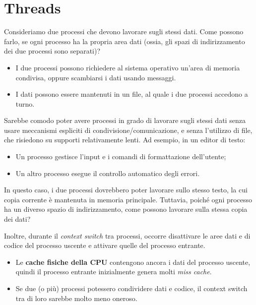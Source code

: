 \chapter{Threads}

Consideriamo due processi che devono lavorare sugli stessi dati. Come possono farlo, se ogni processo ha la propria area dati (ossia, gli spazi di indirizzamento dei due processi sono separati)?

\begin{itemize}
    \item I due processi possono richiedere al sistema operativo un’area di memoria condivisa, oppure scambiarsi i dati usando messaggi.
    \item I dati possono essere mantenuti in un file, al quale i due processi accedono a turno.
\end{itemize}

Sarebbe comodo poter avere processi in grado di lavorare sugli stessi dati senza usare meccanismi espliciti di condivisione/comunicazione, e senza l’utilizzo di file, che risiedono su supporti relativamente lenti. Ad esempio, in un editor di testo:
\begin{itemize}
    \item Un processo gestisce l’input e i comandi di formattazione dell’utente;
    \item Un altro processo esegue il controllo automatico degli errori.
\end{itemize}

In questo caso, i due processi dovrebbero poter lavorare sullo stesso testo, la cui copia corrente è mantenuta in memoria principale. Tuttavia, poiché ogni processo ha un diverso spazio di indirizzamento, come possono lavorare sulla stessa copia dei dati?

Inoltre, durante il \textit{context switch} tra processi, occorre disattivare le aree dati e di codice del processo uscente e attivare quelle del processo entrante. 

\begin{itemize}
    \item Le \textbf{cache fisiche della CPU} contengono ancora i dati del processo uscente, quindi il processo entrante inizialmente genera molti \textit{miss cache}.
    \item Se due (o più) processi potessero condividere dati e codice, il context switch tra di loro sarebbe molto meno oneroso.
\end{itemize}

